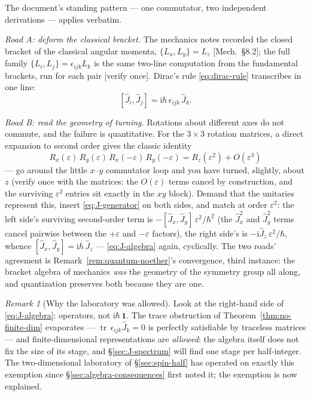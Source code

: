 \documentclass[11pt]{article}
\theoremstyle{plain}
\theoremstyle{definition}
\theoremstyle{remark}
\newtheorem{remark}[theorem]{Remark}
\newcommand{\ii}{\mathrm{i}}
\newcommand{\op}[1]{\hat{#1}}
\newcommand{\idop}{\mathbf{1}}  %
\begin{document}
The document's standing pattern --- one commutator, two independent
derivations --- applies verbatim.

\emph{Road A: deform the classical bracket.} The mechanics notes
recorded the closed bracket of the classical angular momenta,
$\{L_x, L_y\} = L_z$ [Mech.\ \S8.2]; the full family
$\{L_i, L_j\} = \epsilon_{ijk} L_k$ is the same two-line
computation from the fundamental brackets, run for each pair
[verify once]. Dirac's rule
\eqref{eq:dirac-rule} transcribes in one line:
\begin{equation}
  \boxed{\;
  [\op J_i, \op J_j]
  = \ii\hbar\,\epsilon_{ijk}\,\op J_k .
  \;}
  \label{eq:J-algebra}
\end{equation}

\emph{Road B: read the geometry of turning.} Rotations about
different axes do not commute, and the failure is quantitative.
For the $3\times3$ rotation matrices, a direct expansion to second
order gives the classic identity
\begin{equation}
  R_x(\varepsilon)\,R_y(\varepsilon)\,
  R_x(-\varepsilon)\,R_y(-\varepsilon)
  = R_z(\varepsilon^2) + O(\varepsilon^3)
  \label{eq:rotation-commutator}
\end{equation}
--- go around the little $x$--$y$ commutator loop and you have
turned, slightly, about $z$ (verify once with the matrices: the
$O(\varepsilon)$ terms cancel by construction, and the surviving
$\varepsilon^2$ entries sit exactly in the $xy$ block). Demand that
the unitaries represent this, insert \eqref{eq:J-generator} on both
sides, and match at order $\varepsilon^2$: the left side's surviving
second-order term is
$-[\op J_x, \op J_y]\,\varepsilon^2/\hbar^2$ (the $\op J_x^2$ and
$\op J_y^2$ terms cancel pairwise between the $+\varepsilon$ and
$-\varepsilon$ factors), the right side's is
$-\ii\op J_z\,\varepsilon^2/\hbar$, whence
$[\op J_x, \op J_y] = \ii\hbar\,\op J_z$ --- \eqref{eq:J-algebra}
again, cyclically. The two roads' agreement is
Remark~\ref{rem:quantum-noether}'s convergence, third instance: the
bracket algebra of mechanics \emph{was} the geometry of the
symmetry group all along, and quantization preserves both because
they are one.

\begin{remark}[Why the laboratory was allowed]
\label{rem:finite-dim-legal}
Look at the right-hand side of \eqref{eq:J-algebra}: operators, not
$\ii\hbar\,\idop$. The trace obstruction of
Theorem~\ref{thm:no-finite-dim} evaporates ---
$\operatorname{tr}\,\epsilon_{ijk}\op J_k = 0$ is perfectly
satisfiable by traceless matrices --- and finite-dimensional
representations are \emph{allowed}: the algebra itself does not fix
the size of its stage, and \S\ref{sec:J-spectrum} will find one
stage per half-integer. The two-dimensional laboratory of
\S\ref{sec:spin-half} has operated on exactly this exemption since
\S\ref{sec:algebra-consequences} first noted it; the exemption is
now explained.
\end{remark}
\end{document}
